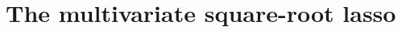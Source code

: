 \documentclass[12pt]{article}
\newcommand{\argmin}{\operatorname*{arg \ min}}
\begin{document}





\section{The multivariate square-root lasso}
\end{document}
